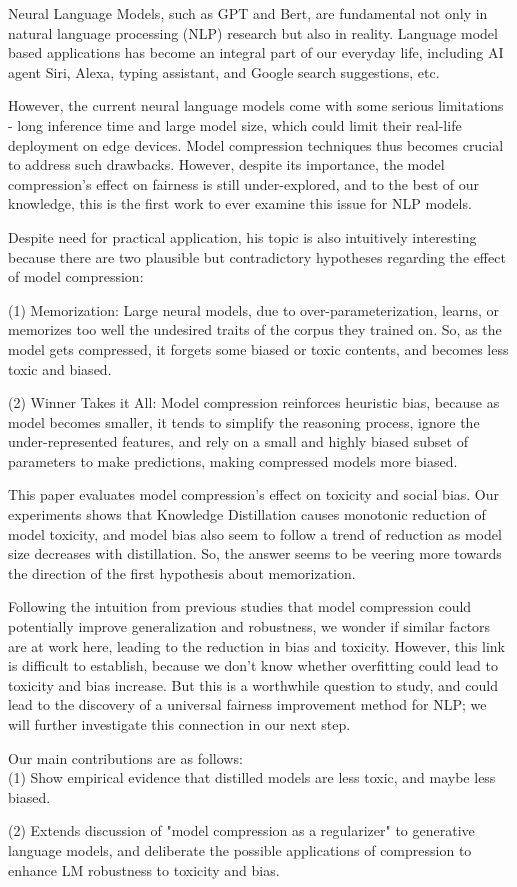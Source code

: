 Neural Language Models, such as GPT and Bert, are fundamental not only in natural language processing (NLP) research but also in reality. Language model based applications has become an integral part of our everyday life, including AI agent Siri, Alexa, typing assistant, and Google search suggestions, etc.

However, the current neural language models come with some serious limitations - long inference time and large model size, which could limit their real-life deployment on edge devices. Model compression techniques thus becomes crucial to address such drawbacks. However, despite its importance, the  model compression's effect on fairness is still under-explored, and to the best of our knowledge, this is the first work to ever examine this issue for NLP models. 

Despite need for practical application, his topic is also intuitively interesting because there are two plausible but contradictory hypotheses regarding the effect of model compression:

(1) Memorization: Large neural models, due to over-parameterization, learns, or memorizes too well the undesired traits of the corpus they trained on. So, as the model gets compressed, it forgets some biased or toxic contents, and becomes less toxic and biased. 

(2) Winner Takes it All: Model compression reinforces heuristic bias, because as model becomes smaller, it tends to simplify the reasoning process, ignore the under-represented features, and rely on a small and highly biased subset of parameters to make predictions, making compressed models more biased.

This paper evaluates model compression's effect on toxicity and social bias. Our experiments shows that Knowledge Distillation causes monotonic reduction of model toxicity, and model bias also seem to follow a trend of reduction as model size decreases with distillation. So, the answer seems to be veering more towards the direction of the first hypothesis about memorization.

Following the intuition from previous studies that model compression could potentially improve generalization\cite{Bartoldson2020TheGT} \cite{Arani2019ImprovingGA} and robustness\cite{Goldblum2020AdversariallyRD}, we wonder if similar factors are at work here, leading to the reduction in bias and toxicity. However, this link is difficult to establish, because we don't know whether overfitting could lead to toxicity and bias increase. But this is a worthwhile question to study, and could lead to the discovery of a universal fairness improvement method for NLP; we will further investigate this connection in our next step.

Our main contributions are as follows:\\
(1) Show empirical evidence that distilled models are less toxic, and maybe less biased.

(2) Extends discussion of "model compression as a regularizer" to generative language models, and deliberate the possible applications of compression to enhance LM robustness to toxicity and bias.
